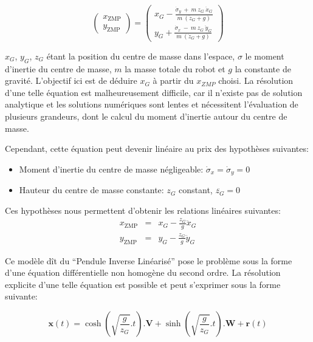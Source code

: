 \begin{equation}
\left(
\begin{array}{cc}
x_{\text{ZMP}}\\
y_{\text{ZMP}}
\end{array}
\right) = \left(
\begin{array}{cc}
x_G - \frac{\dot{\sigma}_y\ +\ m\ z_G\ \ddot{x}_G}{m\ (\ddot{z}_G + g)}\\
y_G + \frac{\dot{\sigma}_x\ -\ m\ z_G\ \ddot{y}_G}{m\ (\ddot{z}_G + g)}
\end{array}
\right)
\end{equation}

$x_G$, $y_G$, $z_G$ étant la position du centre de masse dans
l'espace, $\sigma$ le moment d'inertie du centre de masse, $m$ la
masse totale du robot et $g$ la constante de gravité. L'objectif ici
est de déduire $x_{G}$ à partir du $x_{ZMP}$ choisi. La résolution
d'une telle équation est malheureusement difficile, car il n'existe
pas de solution analytique et les solutions numériques sont lentes et
nécessitent l'évaluation de plusieurs grandeurs, dont le calcul du
moment d'inertie autour du centre de masse.

Cependant, cette équation peut devenir linéaire au prix des hypothèses
suivantes:
\begin{itemize}
\item Moment d'inertie du centre de masse négligeable: $\dot{\sigma}_x = \dot{\sigma}_y = 0$
\item Hauteur du centre de masse constante: $z_G$ constant, $\ddot{z_G} = 0$
\end{itemize}

Ces hypothèses nous permettent d'obtenir les relations linéaires suivantes:
\begin{eqnarray*}\label{eq:zmplin}
x_{\text{ZMP}} &=& x_G - \frac{z_G}{g} \ddot{x}_G\\
y_{\text{ZMP}} &=& y_G - \frac{z_G}{g} \ddot{y}_G
\end{eqnarray*}

Ce modèle dît du ``Pendule Inverse Linéarisé'' pose le problème sous la forme d'une équation
différentielle non homogène du second ordre. La résolution explicite
d'une telle équation est possible et peut s'exprimer sous la forme
suivante:

\begin{equation}
  \mathbf{x}(t) = \cosh(\sqrt{\frac{g}{z_G}}.t) . \mathbf{V} + \sinh(\sqrt{\frac{g}{z_G}}.t) . \mathbf{W} + \mathbf{r}(t)
\end{equation}


